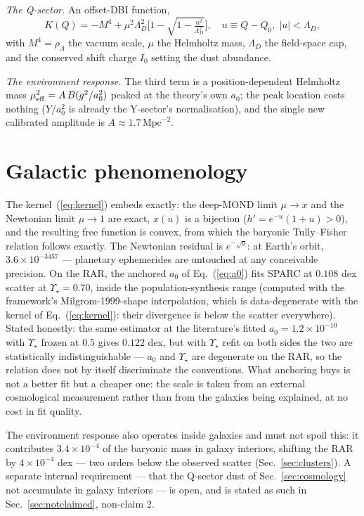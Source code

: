 \documentclass[aps,prd,twocolumn,10pt,nofootinbib,superscriptaddress]{revtex4-2}
\begin{document}
\emph{The Q-sector.} An offset-DBI function,
\begin{equation}
K(Q) = -M^4 + \mu^2\Lambda_D^2\Big[1-\sqrt{1-\tfrac{u^2}{\Lambda_D^2}}\Big],
\quad u\equiv Q-Q_0,\;|u|<\Lambda_D,
\label{eq:K}
\end{equation}
with $M^4=\rho_\Lambda$ the vacuum scale, $\mu$ the Helmholtz mass, $\Lambda_D$ the field-space
cap, and the conserved shift charge $I_0$ setting the dust abundance.

\emph{The environment response.} The third term is a position-dependent Helmholtz mass
$\mu^2_{\rm eff}=A\,B(g^2/a_0^2)$ peaked at the theory's own $a_0$; the peak location costs nothing
($Y/a_0^2$ is already the Y-sector's normalisation), and the single new calibrated amplitude is
$A\approx1.7\,\mathrm{Mpc}^{-2}$.

\section{Galactic phenomenology}
\label{sec:galaxies}

The kernel~(\ref{eq:kernel}) embeds exactly: the deep-MOND limit $\mu\to x$ and the Newtonian limit
$\mu\to1$ are exact, $x(u)$ is a bijection ($h'=e^{-u}(1+u)>0$), and the resulting free function is
convex, from which the baryonic Tully--Fisher relation follows exactly. The Newtonian residual is
$e^{-\sqrt y}$: at Earth's orbit, $3.6\times10^{-3457}$ --- planetary ephemerides are untouched at
any conceivable precision. On the RAR, the anchored $a_0$ of Eq.~(\ref{eq:a0}) fits SPARC at
$0.108$ dex scatter at $\Upsilon_\star=0.70$, inside the population-synthesis range (computed with
the framework's Milgrom-1999-shape interpolation, which is data-degenerate with the kernel of
Eq.~(\ref{eq:kernel}): their divergence is below the scatter everywhere). Stated honestly: the same
estimator at the literature's fitted $a_0=1.2\times10^{-10}$ with $\Upsilon_\star$ frozen at $0.5$
gives $0.122$ dex, but with $\Upsilon_\star$ refit on both sides the two are statistically
indistinguishable --- $a_0$ and $\Upsilon_\star$ are degenerate on the RAR, so the relation does
not by itself discriminate the conventions. What anchoring buys is not a better fit but a cheaper
one: the scale is taken from an external cosmological measurement rather than from the galaxies
being explained, at no cost in fit quality.

The environment response also operates inside galaxies and must not spoil this: it contributes
$3.4\times10^{-4}$ of the baryonic mass in galaxy interiors, shifting the RAR by
$4\times10^{-4}$ dex --- two orders below the observed scatter (Sec.~\ref{sec:clusters}). A separate
internal requirement --- that the Q-sector dust of Sec.~\ref{sec:cosmology} not accumulate in galaxy
interiors --- is open, and is stated as such in Sec.~\ref{sec:notclaimed}, non-claim 2.
\end{document}

